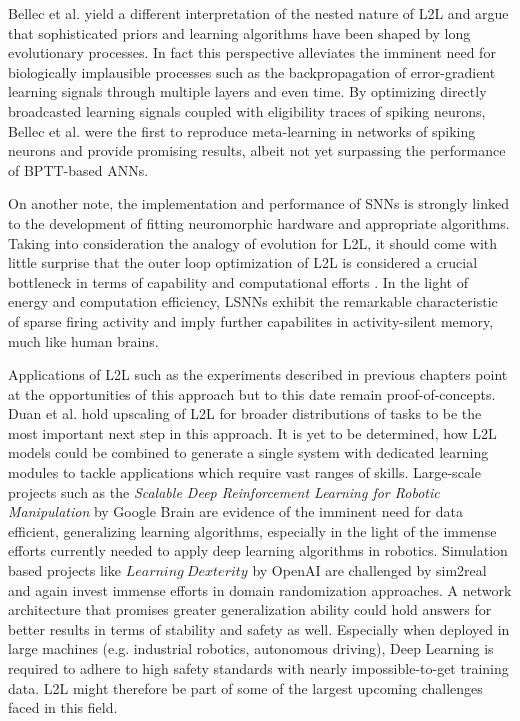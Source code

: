 \documentclass[letterpaper, 10 pt, conference]{ieeeconf}  %
\begin{document}
Bellec et al.\cite{bellecLongShorttermMemory2018} yield a different interpretation of the nested nature of L2L and argue that 
sophisticated priors and learning algorithms have been
shaped by long evolutionary processes. In fact this perspective alleviates the imminent need for biologically implausible processes such as the 
backpropagation of error-gradient learning signals through multiple layers and even time. By optimizing directly broadcasted learning signals coupled
with eligibility traces of spiking neurons, Bellec et al. were the first to reproduce meta-learning in networks of spiking neurons and provide 
promising results, albeit not yet surpassing the performance of BPTT-based ANNs. \newline

On another note, the implementation and performance of SNNs is strongly linked to the development of fitting neuromorphic hardware and appropriate
algorithms. Taking into consideration the analogy of evolution for L2L, it should come with little surprise that the outer loop optimization of L2L 
is considered a crucial bottleneck in terms of capability and computational efforts \cite{duanBenchmarkingDeepReinforcement}. 
In the light of energy and computation efficiency, 
LSNNs exhibit the remarkable characteristic of sparse firing activity and imply further capabilites in activity-silent memory, much like 
human brains. \newline

Applications of L2L such as the experiments described in previous chapters point at the opportunities of this approach but to this date remain
proof-of-concepts. Duan et al.\cite{duanRLFastReinforcement2016} hold upscaling of L2L for broader distributions of tasks to be 
the most important next step in this approach. It 
is yet to be determined, how L2L models could be combined to generate a single system with dedicated learning modules to tackle applications which 
require vast ranges of skills.
Large-scale projects such as the \textit{Scalable Deep Reinforcement Learning for Robotic Manipulation} 
by Google Brain\cite{ScalableDeepReinforcement} are evidence of the imminent need for data efficient, 
generalizing learning algorithms, 
especially in the light of the immense efforts currently needed to 
apply deep learning algorithms in robotics. Simulation based projects like $Learning\ Dexterity$ by OpenAI \cite{LearningDexterity2018} 
are challenged by sim2real and 
again invest immense efforts in domain randomization approaches. A network architecture that promises greater generalization ability could hold 
answers for better results in terms of stability and safety as well. Especially when deployed in large machines 
(e.g. industrial robotics, autonomous driving),
Deep Learning is required to adhere to high safety standards with nearly impossible-to-get training data. 
L2L might therefore be part of some of 
the largest upcoming challenges faced in this field.
\end{document}
